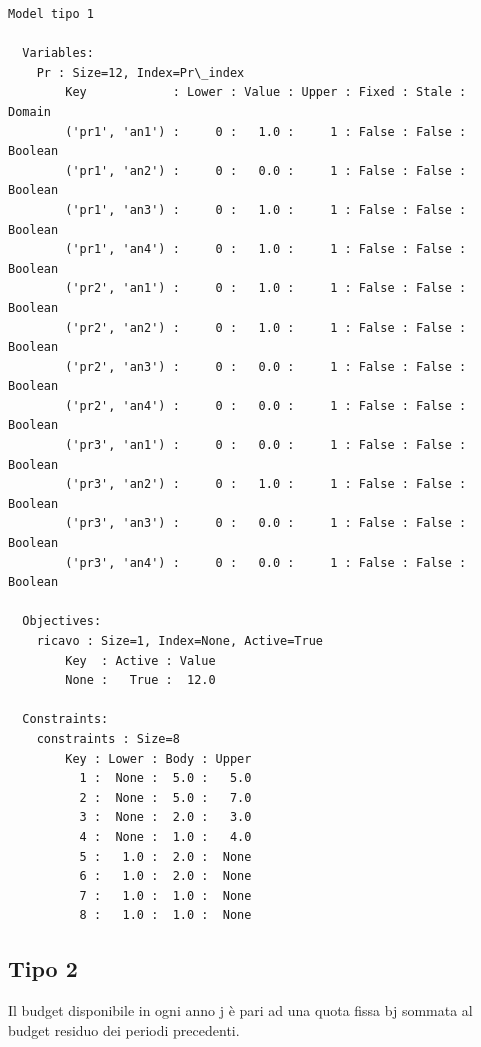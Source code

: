 \documentclass[11pt]{article}
\begin{document}
    \begin{Verbatim}[commandchars=\\\{\}]
Model tipo 1

  Variables:
    Pr : Size=12, Index=Pr\_index
        Key            : Lower : Value : Upper : Fixed : Stale : Domain
        ('pr1', 'an1') :     0 :   1.0 :     1 : False : False : Boolean
        ('pr1', 'an2') :     0 :   0.0 :     1 : False : False : Boolean
        ('pr1', 'an3') :     0 :   1.0 :     1 : False : False : Boolean
        ('pr1', 'an4') :     0 :   1.0 :     1 : False : False : Boolean
        ('pr2', 'an1') :     0 :   1.0 :     1 : False : False : Boolean
        ('pr2', 'an2') :     0 :   1.0 :     1 : False : False : Boolean
        ('pr2', 'an3') :     0 :   0.0 :     1 : False : False : Boolean
        ('pr2', 'an4') :     0 :   0.0 :     1 : False : False : Boolean
        ('pr3', 'an1') :     0 :   0.0 :     1 : False : False : Boolean
        ('pr3', 'an2') :     0 :   1.0 :     1 : False : False : Boolean
        ('pr3', 'an3') :     0 :   0.0 :     1 : False : False : Boolean
        ('pr3', 'an4') :     0 :   0.0 :     1 : False : False : Boolean

  Objectives:
    ricavo : Size=1, Index=None, Active=True
        Key  : Active : Value
        None :   True :  12.0

  Constraints:
    constraints : Size=8
        Key : Lower : Body : Upper
          1 :  None :  5.0 :   5.0
          2 :  None :  5.0 :   7.0
          3 :  None :  2.0 :   3.0
          4 :  None :  1.0 :   4.0
          5 :   1.0 :  2.0 :  None
          6 :   1.0 :  2.0 :  None
          7 :   1.0 :  1.0 :  None
          8 :   1.0 :  1.0 :  None
    \end{Verbatim}

\newpage

    \hypertarget{tipo-2}{%
\subsection{Tipo 2}\label{tipo-2}}

Il budget disponibile in ogni anno j è pari ad una quota fissa bj
sommata al budget residuo dei periodi precedenti.
\end{document}
